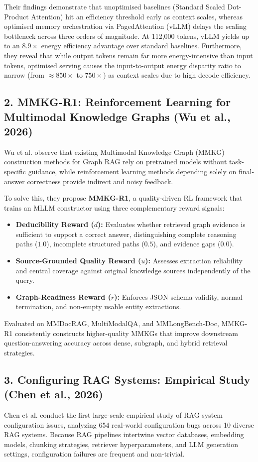 \documentclass[10pt,journal,compsoc]{IEEEtran}
\begin{document}
Their findings demonstrate that unoptimised baselines (Standard Scaled Dot-Product Attention) hit an efficiency threshold early as context scales, whereas optimised memory orchestration via PagedAttention (vLLM) delays the scaling bottleneck across three orders of magnitude. At 112,000 tokens, vLLM yields up to an $8.9\times$ energy efficiency advantage over standard baselines. Furthermore, they reveal that while output tokens remain far more energy-intensive than input tokens, optimised serving causes the input-to-output energy disparity ratio to narrow (from $\approx 850\times$ to $750\times$) as context scales due to high decode efficiency.

\subsection{2. MMKG-R1: Reinforcement Learning for Multimodal Knowledge Graphs (Wu et al., 2026)}
Wu et al. \cite{wu2026mmkg} observe that existing Multimodal Knowledge Graph (MMKG) construction methods for Graph RAG rely on pretrained models without task-specific guidance, while reinforcement learning methods depending solely on final-answer correctness provide indirect and noisy feedback. 

To solve this, they propose \textbf{MMKG-R1}, a quality-driven RL framework that trains an MLLM constructor using three complementary reward signals:
\begin{itemize}
    \item \textbf{Deducibility Reward ($d$):} Evaluates whether retrieved graph evidence is sufficient to support a correct answer, distinguishing complete reasoning paths ($1.0$), incomplete structured paths ($0.5$), and evidence gaps ($0.0$).
    \item \textbf{Source-Grounded Quality Reward ($u$):} Assesses extraction reliability and central coverage against original knowledge sources independently of the query.
    \item \textbf{Graph-Readiness Reward ($r$):} Enforces JSON schema validity, normal termination, and non-empty usable entity extractions.
\end{itemize}
Evaluated on MMDocRAG, MultiModalQA, and MMLongBench-Doc, MMKG-R1 consistently constructs higher-quality MMKGs that improve downstream question-answering accuracy across dense, subgraph, and hybrid retrieval strategies.

\subsection{3. Configuring RAG Systems: Empirical Study (Chen et al., 2026)}
Chen et al. \cite{chen2026configuring} conduct the first large-scale empirical study of RAG system configuration issues, analyzing 654 real-world configuration bugs across 10 diverse RAG systems. Because RAG pipelines intertwine vector databases, embedding models, chunking strategies, retriever hyperparameters, and LLM generation settings, configuration failures are frequent and non-trivial.
\end{document}
